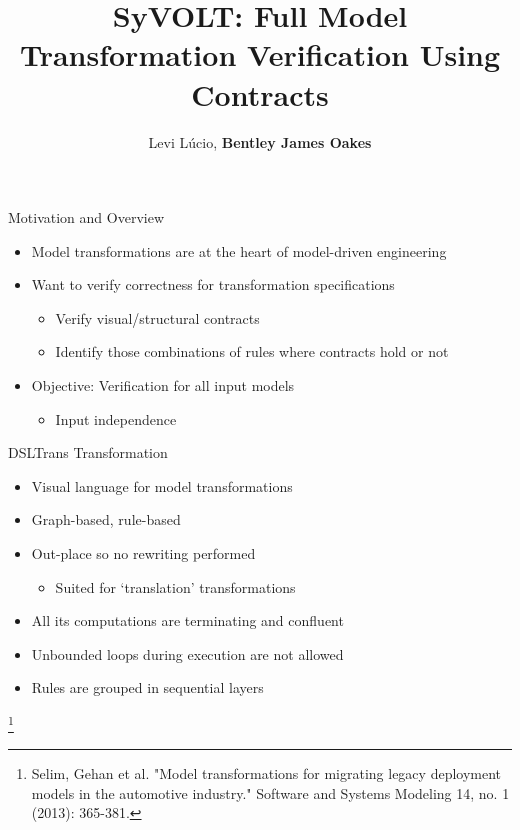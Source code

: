 \documentclass[xcolor=dvipsnames, 12pt, handout]{beamer}
\title[SyVOLT]{SyVOLT: Full Model Transformation Verification Using Contracts}
\author[Lucio, Oakes]{Levi L\'{u}cio, \textbf{Bentley James Oakes}}
\institute[]{McGill University, Canada\\fortiss, Munich}
\newcommand\blfootnote[1]{%
  \begingroup
  \renewcommand\thefootnote{}\footnote{#1}%
  \addtocounter{footnote}{-1}%
  \endgroup
}
\begin{document}
\maketitle


\begin{frame}{Motivation and Overview}
\begin{itemize}[<+->]
\item Model transformations are at the heart of model-driven engineering
\item Want to verify correctness for transformation specifications
\begin{itemize}[<+->]
\item Verify visual/structural contracts
\item Identify those combinations of rules where contracts hold or not
\end{itemize}
\item Objective: Verification for all input models
\begin{itemize}
\item Input independence
\end{itemize}
\end{itemize}
\end{frame}






\begin{frame}{DSLTrans Transformation}

\begin{itemize}[<+->]
\item Visual language for model transformations

\item Graph-based, rule-based
\item Out-place so no rewriting performed
\begin{itemize}
\item Suited for `translation' transformations
\end{itemize}
\item All its computations are terminating and confluent
\item Unbounded loops during execution are not allowed

\item Rules are grouped in sequential layers
\end{itemize}

\blfootnote{Selim, Gehan et al. "Model transformations for migrating legacy deployment models in the automotive industry." Software and Systems Modeling 14, no. 1 (2013): 365-381.}

\end{frame}
\end{document}
